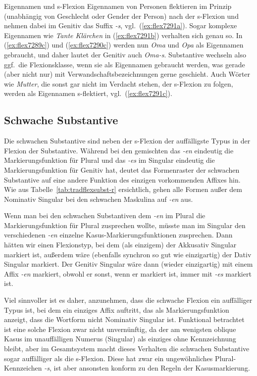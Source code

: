 \begin{Vertiefung}{Eigennamen und s-Flexion}
Eigennamen von Personen flektieren im Prinzip (unabhängig von Geschlecht oder Gender der Person) nach der s-Flexion und nehmen dabei im Genitiv das Suffix \textit{-s}, vgl.\ (\ref{ex:flex7291a}).
Sogar komplexe Eigennamen wie \textit{Tante Klärchen} in (\ref{ex:flex7291b}) verhalten sich genau so.
In (\ref{ex:flex7289c}) und (\ref{ex:flex7290c}) werden nun \textit{Oma} und \textit{Opa} als Eigennamen gebraucht, und daher lautet der Genitiv auch \textit{Oma-s}.
Substantive wechseln also ggf.\ die Flexionsklasse, wenn sie als Eigennamen gebraucht werden, was gerade (aber nicht nur) mit Verwandschaftsbezeichnungen gerne geschieht.
Auch Wörter wie \textit{Mutter}, die sonst gar nicht im Verdacht stehen, der s-Flexion zu folgen, werden als Eigennamen s-flektiert, vgl.\ (\ref{ex:flex7291c}).

\end{Vertiefung}

\subsection{Schwache Substantive}

\label{sec:schwachsubst}


Die schwachen Substantive sind neben der s-Flexion der auffälligste Typus in der Flexion der Substantive.
Während bei den gemischten das \textit{-en} eindeutig die Markierungsfunktion für Plural und das \textit{-es} im Singular eindeutig die Markierungsfunktion für Genitiv hat, deutet das Formenraster der schwachen Substantive auf eine andere Funktion des einzigen vorkommenden Affixes hin.
Wie aus Tabelle~\ref{tab:tradflexsubst-r} ersichtlich, gehen alle Formen außer dem Nominativ Singular bei den schwachen Maskulina auf \textit{-en} aus.

Wenn man bei den schwachen Substantiven dem \textit{-en} im Plural die Markierungsfunktion für Plural zusprechen wollte, müsste man im Singular den verschiedenen \textit{-en} einzelne Kasus-Markierungsfunktionen zusprechen.
Dann hätten wir einen Flexionstyp, bei dem (als einzigem) der Akkusativ Singular markiert ist, außerdem wäre (ebenfalls synchron so gut wie einzigartig) der Dativ Singular markiert.
Der Genitiv Singular wäre dann (wieder einzigartig) mit einem Affix \textit{-en} markiert, obwohl er sonst, wenn er markiert ist, immer mit \textit{-es} markiert ist.

Viel sinnvoller ist es daher, anzunehmen, dass die schwache Flexion ein auffälliger Typus ist, bei dem ein einziges Affix auftritt, das als Markierungsfunktion anzeigt, dass die Wortform nicht Nominativ Singular ist.
Funktional betrachtet ist eine solche Flexion zwar nicht unvernünftig, da der am wenigsten oblique Kasus im unauffälligen Numerus (Singular) als einziges ohne Kennzeichnung bleibt, aber im Gesamtsystem macht dieses Verhalten die schwachen Substantive sogar auffälliger als die s-Flexion.
Diese hat zwar ein ungewöhnliches Plural-Kennzeichen \textit{-s}, ist aber ansonsten konform zu den Regeln der Kasusmarkierung.


